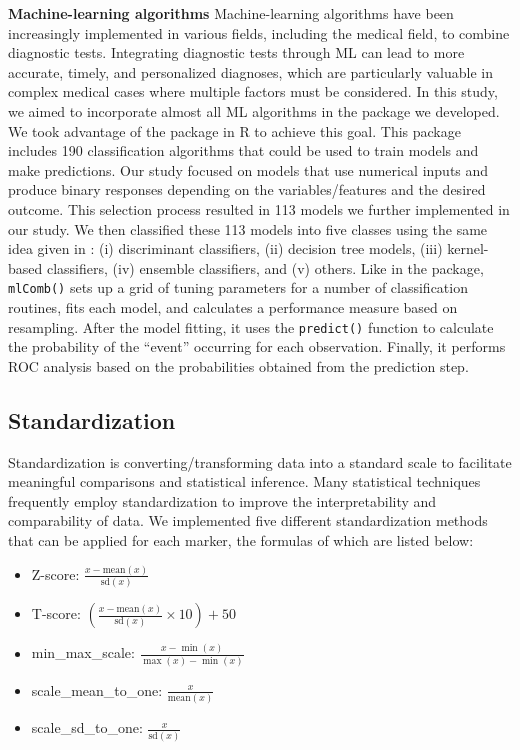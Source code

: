 \textbf{Machine-learning algorithms}
Machine-learning algorithms have been increasingly implemented in various fields, including the medical field, to combine diagnostic tests. Integrating diagnostic tests through ML can lead to more accurate, timely, and personalized diagnoses, which are particularly valuable in complex medical cases where multiple factors must be considered. In this study, we aimed to incorporate almost all ML algorithms in the package we developed. We took advantage of the  package in R \citep{kuhn2008building} to achieve this goal. This package includes 190 classification algorithms that could be used to train models and make predictions. Our study focused on models that use numerical inputs and produce binary responses depending on the variables/features and the desired outcome. This selection process resulted in 113 models we further implemented in our study. We then classified these 113 models into five classes using the same idea given in \citep{zararsiz2016statistical}: (i) discriminant classifiers, (ii) decision tree models, (iii) kernel-based classifiers, (iv) ensemble classifiers, and (v) others. Like in the  package, \texttt{mlComb()} sets up a grid of tuning parameters for a number of classification routines, fits each model, and calculates a performance measure based on resampling. After the model fitting, it uses the \texttt{predict()} function to calculate the probability of the ``event'' occurring for each observation. Finally, it performs ROC analysis based on the probabilities obtained from the prediction step.

\subsection{Standardization}\label{standardization}

Standardization is converting/transforming data into a standard scale to facilitate meaningful comparisons and statistical inference. Many statistical techniques frequently employ standardization to improve the interpretability and comparability of data. We implemented five different standardization methods that can be applied for each marker, the formulas of which are listed below:

\begin{itemize}
\tightlist
\item
  Z-score: \(\frac{x - \text{mean}(x)}{\text{sd}(x)}\)
\item
  T-score: \(\left( \frac{x - \text{mean}(x)}{\text{sd}(x)} \times 10 \right) + 50\)
\item
  min\_max\_scale: \(\frac{x - \min(x)}{\max(x) - \min(x)}\)
\item
  scale\_mean\_to\_one: \(\frac{x}{\text{mean}(x)}\)
\item
  scale\_sd\_to\_one: \(\frac{x}{\text{sd}(x)}\)
\end{itemize}

